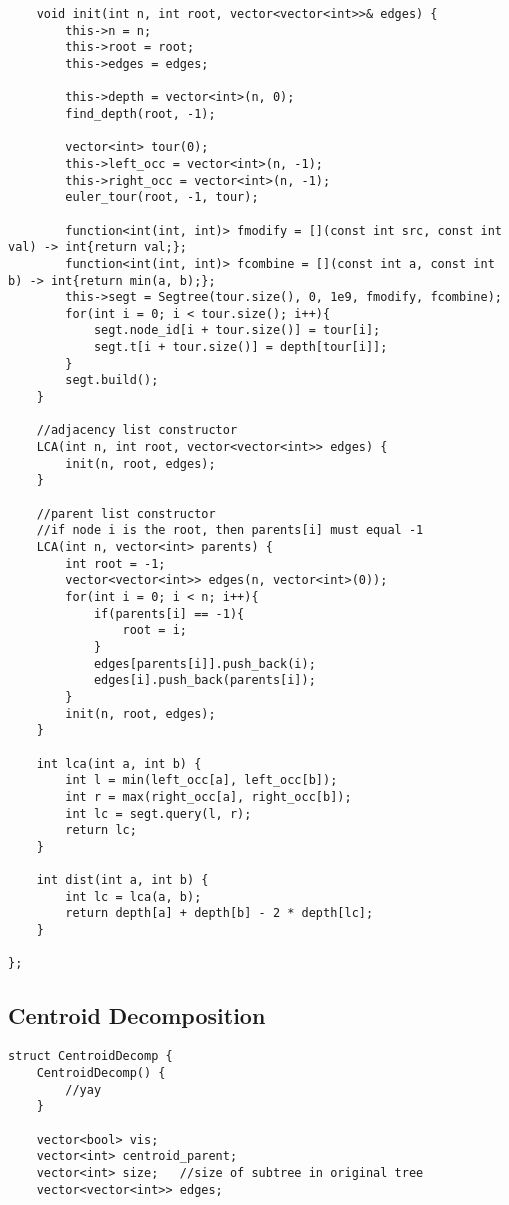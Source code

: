 \documentclass[8pt, headheight=10pt]{scrartcl}
\begin{document}
\begin{multicols*}{3}
\begin{lstlisting}
    void init(int n, int root, vector<vector<int>>& edges) {
        this->n = n;
        this->root = root;
        this->edges = edges;

        this->depth = vector<int>(n, 0);
        find_depth(root, -1);

        vector<int> tour(0);
        this->left_occ = vector<int>(n, -1);
        this->right_occ = vector<int>(n, -1);
        euler_tour(root, -1, tour);

        function<int(int, int)> fmodify = [](const int src, const int val) -> int{return val;};
        function<int(int, int)> fcombine = [](const int a, const int b) -> int{return min(a, b);};
        this->segt = Segtree(tour.size(), 0, 1e9, fmodify, fcombine);
        for(int i = 0; i < tour.size(); i++){
            segt.node_id[i + tour.size()] = tour[i];
            segt.t[i + tour.size()] = depth[tour[i]];
        }
        segt.build();
    }

    //adjacency list constructor
    LCA(int n, int root, vector<vector<int>> edges) {
        init(n, root, edges);
    }

    //parent list constructor
    //if node i is the root, then parents[i] must equal -1
    LCA(int n, vector<int> parents) {
        int root = -1;
        vector<vector<int>> edges(n, vector<int>(0));
        for(int i = 0; i < n; i++){
            if(parents[i] == -1){
                root = i;
            }
            edges[parents[i]].push_back(i);
            edges[i].push_back(parents[i]);
        }
        init(n, root, edges);
    }

    int lca(int a, int b) {
        int l = min(left_occ[a], left_occ[b]);
        int r = max(right_occ[a], right_occ[b]);
        int lc = segt.query(l, r);
        return lc;
    }

    int dist(int a, int b) {
        int lc = lca(a, b);
        return depth[a] + depth[b] - 2 * depth[lc];
    }

};
\end{lstlisting}

\subsection{Centroid Decomposition}
\begin{lstlisting}
struct CentroidDecomp {
    CentroidDecomp() {
        //yay
    }

    vector<bool> vis;
    vector<int> centroid_parent;
    vector<int> size;   //size of subtree in original tree
    vector<vector<int>> edges;


\end{lstlisting}
\end{multicols*}
\end{document}
